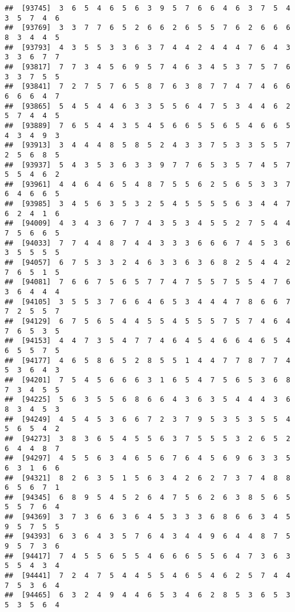 \documentclass[
]{book}
\begin{document}
\begin{verbatim}
##  [93745]  3  6  5  4  6  5  6  3  9  5  7  6  6  4  6  3  7  5  4  3  5  7  4  6
##  [93769]  3  3  7  7  6  5  2  6  6  2  6  5  5  7  6  2  6  6  6  8  3  4  4  5
##  [93793]  4  3  5  5  3  3  6  3  7  4  4  2  4  4  4  7  6  4  3  3  3  6  7  7
##  [93817]  7  7  3  4  5  6  9  5  7  4  6  3  4  5  3  7  5  7  6  3  3  7  5  5
##  [93841]  7  2  7  5  7  6  5  8  7  6  3  8  7  7  4  7  4  6  6  6  6  6  4  7
##  [93865]  5  4  5  4  4  6  3  3  5  5  6  4  7  5  3  4  4  6  2  5  7  4  4  5
##  [93889]  7  6  5  4  4  3  5  4  5  6  6  5  5  6  5  4  6  6  5  4  3  4  9  3
##  [93913]  3  4  4  4  8  5  8  5  2  4  3  3  7  5  3  3  5  5  7  2  5  6  8  5
##  [93937]  5  4  3  5  3  6  3  3  9  7  7  6  5  3  5  7  4  5  7  5  5  4  6  2
##  [93961]  4  4  6  4  6  5  4  8  7  5  5  6  2  5  6  5  3  3  7  6  4  6  6  5
##  [93985]  3  4  5  6  3  5  3  2  5  4  5  5  5  5  6  3  4  4  7  6  2  4  1  6
##  [94009]  4  3  4  3  6  7  7  4  3  5  3  4  5  5  2  7  5  4  4  7  5  6  6  5
##  [94033]  7  7  4  4  8  7  4  4  3  3  3  6  6  6  7  4  5  3  6  3  5  5  5  5
##  [94057]  6  7  5  3  3  2  4  6  3  3  6  3  6  8  2  5  4  4  2  7  6  5  1  5
##  [94081]  7  6  6  7  5  6  5  7  7  4  7  5  5  7  5  5  4  7  6  3  6  4  4  4
##  [94105]  3  5  5  3  7  6  6  4  6  5  3  4  4  4  7  8  6  6  7  7  2  5  5  7
##  [94129]  6  7  5  6  5  4  4  5  5  4  5  5  5  7  5  7  4  6  4  7  6  5  3  5
##  [94153]  4  4  7  3  5  4  7  7  4  6  4  5  4  6  6  4  6  5  4  6  5  5  7  5
##  [94177]  4  6  5  8  6  5  2  8  5  5  1  4  4  7  7  8  7  7  4  5  3  6  4  3
##  [94201]  7  5  4  5  6  6  6  3  1  6  5  4  7  5  6  5  3  6  8  7  3  4  5  5
##  [94225]  5  6  3  5  5  6  8  6  6  4  3  6  3  5  4  4  4  3  6  8  3  4  5  3
##  [94249]  4  5  4  5  3  6  6  7  2  3  7  9  5  3  5  3  5  5  4  5  6  5  4  2
##  [94273]  3  8  3  6  5  4  5  5  6  3  7  5  5  5  3  2  6  5  2  6  4  4  8  7
##  [94297]  4  5  5  6  3  4  6  5  6  7  6  4  5  6  9  6  3  3  5  6  3  1  6  6
##  [94321]  8  2  6  3  5  1  5  6  3  4  2  6  2  7  3  7  4  8  8  6  5  6  7  1
##  [94345]  6  8  9  5  4  5  2  6  4  7  5  6  2  6  3  8  5  6  5  5  5  7  6  4
##  [94369]  3  7  3  6  6  3  6  4  5  3  3  3  6  8  6  6  3  4  5  9  5  7  5  5
##  [94393]  6  3  6  4  3  5  7  6  4  3  4  4  9  6  4  4  8  7  5  9  5  7  3  6
##  [94417]  7  4  5  5  6  5  5  4  6  6  6  5  5  6  4  7  3  6  3  5  5  4  3  4
##  [94441]  7  2  4  7  5  4  4  5  5  4  6  5  4  6  2  5  7  4  4  7  5  3  6  4
##  [94465]  6  3  2  4  9  4  4  6  5  3  4  6  2  8  5  3  6  5  3  5  3  5  6  4

\end{verbatim}
\end{document}
